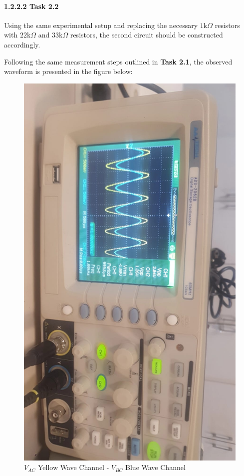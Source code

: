 \documentclass{article}
\begin{document}
\newpage
\paragraph{\textbf{1.2.2.2 Task 2.2}}  
Using the same experimental setup and replacing the necessary $ 1\text{k} \Omega $ resistors with $ 22\text{k} \Omega $ and $ 33\text{k} \Omega $ resistors, the second circuit should be constructed accordingly.  

Following the same measurement steps outlined in \textbf{Task 2.1}, the observed waveform is presented in the figure below:  

\begin{figure}[h]
  \centering
  \includegraphics[scale=0.25, angle=90]{images/Lab1_figure2}
  \caption{$V_{AC}$ Yellow Wave Channel - $V_{BC}$ Blue Wave Channel}
  \label{fig:waveform}
\end{figure}
\end{document}
